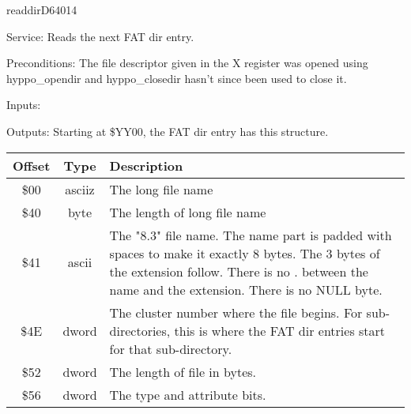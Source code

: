 \newpage
\begin{hyppotrap}{readdir}{D640}{14}
\item [Service:]
  Reads the next FAT dir entry.
\item [Preconditions:]
  The file descriptor given in the X register was opened using hyppo\_opendir
  and hyppo\_closedir hasn't since been used to close it.
\item [Inputs:]
\item [Outputs:]
  Starting at \$YY00, the FAT dir entry has this structure.
  {\setlength{\tabcolsep}{2mm}
  \begin{tabular}{|c|c|p{6.9cm}|}
  \hline
  \textbf{Offset} & \textbf{Type} & \textbf{Description}
  \\\hline
  \$00 & asciiz & The long file name
  \\
  \$40 & byte & The length of long file name
  \\
  \$41 & ascii & The "8.3" file name. The name part is padded with spaces to make
               it exactly 8 bytes. The 3 bytes of the extension follow. There is
               no . between the name and the extension. There is no NULL byte.
  \\
  \$4E & dword & The cluster number where the file begins. For sub-directories,
               this is where the FAT dir entries start for that sub-directory.
  \\
  \$52 & dword & The length of file in bytes.
  \\
  \$56 & dword & The type and attribute bits.
  \\\hline
  \end{tabular}
  }


\end{hyppotrap}

